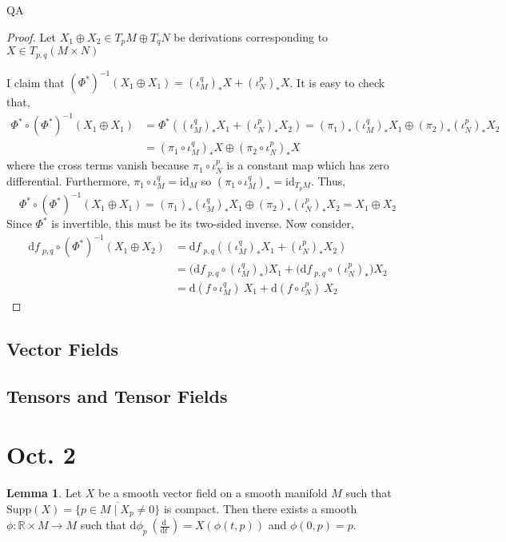 QA	 \documentclass[12pt]{extarticle}
\newcommand{\R}{\mathbb{R}}
\newcommand{\id}{\mathrm{id}}
\renewcommand{\d}[1]{ \mathrm{d}#1 \:}
\newcommand{\deriv}[2]{\frac{\d{#1}}{\d{#2}}}
\theoremstyle{definition}
\newtheorem{lemma}[theorem]{Lemma}
\begin{document}
\begin{proof}
Let $X_1 \oplus X_2 \in T_{p} M \oplus T_{q} N$ be derivations corresponding to $X \in T_{p,q}(M \times N)$ 

I claim that $(\Phi^*)^{-1}(X_1 \oplus X_1) = (\iota_M^q)_* X + (\iota_N^p)_* X$. It is easy to check that,
\begin{align*}
\Phi^* \circ (\Phi^*)^{-1}(X_1 \oplus X_1) & = \Phi^*((\iota_M^q)_* X_1 + (\iota_N^p)_* X_2) = (\pi_1)_* (\iota_M^q)_* X_1 \oplus (\pi_2)_* (\iota_N^p)_* X_2
\\
& = (\pi_1 \circ \iota_M^q)_* X \oplus (\pi_2 \circ \iota_N^p)_* X
\end{align*}
where the cross terms vanish because $\pi_1 \circ \iota_N^p$ is a constant map which has zero differential. Furthermore, $\pi_1 \circ \iota_M^q = \id_M$ so $(\pi_1 \circ \iota_M^q)_* = \id_{T_p M}$. Thus,
\[ \Phi^* \circ (\Phi^*)^{-1}(X_1 \oplus X_1) = (\pi_1)_* (\iota_M^q)_* X_1 \oplus (\pi_2)_* (\iota_N^p)_* X_2 = X_1 \oplus X_2 \]
Since $\Phi^*$ is invertible, this must be its two-sided inverse. Now consider,
\begin{align*}
\d{f}_{p,q} \circ (\Phi^*)^{-1}(X_1 \oplus X_2) & = \d{f}_{p,q}((\iota_M^q)_* X_1 + (\iota_N^p)_* X_2) 
\\
& = \big( \d{f}_{p,q} \circ (\iota_M^q)_* \big) X_1 + \big( \d{f}_{p,q} \circ (\iota_N^p)_* \big) X_2 
\\
& = \d{(f \circ \iota_M^q)} X_1 + \d{(f \circ \iota_N^p)} X_2
\end{align*}
\end{proof}


\subsection{Vector Fields}

\subsection{Tensors and Tensor Fields}

\section{Oct. 2}

\newcommand{\Supp}[1]{\mathrm{Supp}\left( #1 \right)}
\renewcommand{\L}{\mathcal{L}}

\begin{lemma}
Let $X$ be a smooth vector field on a smooth manifold $M$ such that $\Supp{X} = \overline{\{ p \in M \mid X_p \neq 0 \}}$ is compact. Then there exists a smooth $\phi : \R \times M \to M$ such that $\d{\phi_p}(\deriv{}{t}) = X(\phi(t, p))$ and $\phi(0, p) = p$. 
\end{lemma}
\end{document}
